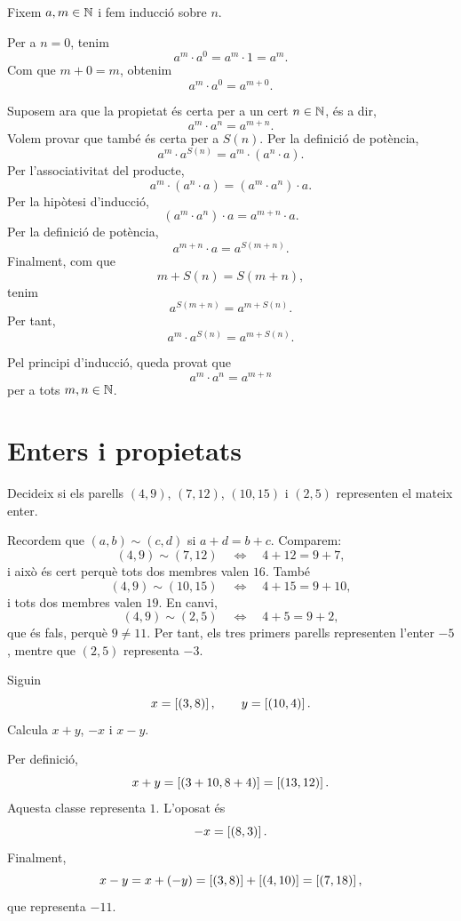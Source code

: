 \begin{solucio}
Fixem \(a,m\in\mathbb{N}\) i fem inducció sobre \(n\).

Per a \(n=0\), tenim
\[
a^m\cdot a^0=a^m\cdot 1=a^m.
\]
Com que \(m+0=m\), obtenim
\[
a^m\cdot a^0=a^{m+0}.
\]

Suposem ara que la propietat és certa per a un cert \(n\in\mathbb{N}\), és a dir,
\[
a^m\cdot a^n=a^{m+n}.
\]
Volem provar que també és certa per a \(S(n)\). Per la definició de potència,
\[
a^m\cdot a^{S(n)}=a^m\cdot(a^n\cdot a).
\]
Per l'associativitat del producte,
\[
a^m\cdot(a^n\cdot a)=(a^m\cdot a^n)\cdot a.
\]
Per la hipòtesi d'inducció,
\[
(a^m\cdot a^n)\cdot a=a^{m+n}\cdot a.
\]
Per la definició de potència,
\[
a^{m+n}\cdot a=a^{S(m+n)}.
\]
Finalment, com que
\[
m+S(n)=S(m+n),
\]
tenim
\[
a^{S(m+n)}=a^{m+S(n)}.
\]
Per tant,
\[
a^m\cdot a^{S(n)}=a^{m+S(n)}.
\]

Pel principi d'inducció, queda provat que
\[
a^m\cdot a^n=a^{m+n}
\]
per a tots \(m,n\in\mathbb{N}\).
\end{solucio}

\section{Enters i propietats}

\begin{exercici}
Decideix si els parells \((4,9)\), \((7,12)\), \((10,15)\) i \((2,5)\) representen el mateix enter.
\end{exercici}

\begin{solucio}
Recordem que \((a,b)\sim(c,d)\) si \(a+d=b+c\). Comparem:
\[
(4,9)\sim(7,12)
\quad\Longleftrightarrow\quad
4+12=9+7,
\]
i això és cert perquè tots dos membres valen \(16\). També
\[
(4,9)\sim(10,15)
\quad\Longleftrightarrow\quad
4+15=9+10,
\]
i tots dos membres valen \(19\). En canvi,
\[
(4,9)\sim(2,5)
\quad\Longleftrightarrow\quad
4+5=9+2,
\]
que és fals, perquè \(9\ne11\). Per tant, els tres primers parells representen l'enter \(-5\), mentre que \((2,5)\) representa \(-3\).
\end{solucio}

\begin{exercici}
Siguin
\[
x=\left[(3,8)\right],
\qquad
 y=\left[(10,4)\right].
\]
Calcula \(x+y\), \(-x\) i \(x-y\).
\end{exercici}

\begin{solucio}
Per definició,
\[
x+y=\left[(3+10,8+4)\right]=\left[(13,12)\right].
\]
Aquesta classe representa \(1\). L'oposat és
\[
-x=\left[(8,3)\right].
\]
Finalment,
\[
x-y=x+(-y)=\left[(3,8)\right]+\left[(4,10)\right]=\left[(7,18)\right],
\]
que representa \(-11\).
\end{solucio}

